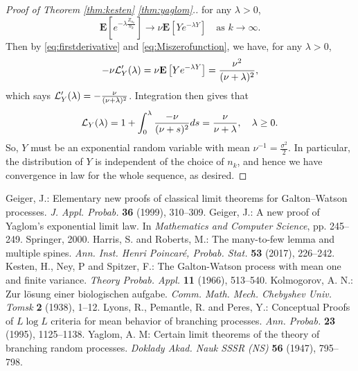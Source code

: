 \documentclass[12pt]{amsart}
\numberwithin{equation}{section}
\newcommand{\brac}[1]{\left[ #1 \right]}
\newcommand{\expct}{\mathbf E}
\begin{document}
\begin{proof}[Proof of Theorem \ref{thm:kesten} \eqref{thm:yaglom}.]
	for any $\lambda >0$,
\begin{equation*}
	    \expct\brac{e^{-\lambda\frac{\dot Z_{n_k}}{n_k}}}
	\to
		\nu\expct\brac{Ye^{-\lambda Y}}%
	\quad
		\text{as } k\to \infty.
\end{equation*}
	Then by \eqref{eq:firstderivative} and \eqref{eq:Miszerofunction}, we have, for any $\lambda >0$,
\begin{equation*}
	    -\nu\cL_Y'(\lambda)
	=
	    \nu\expct\brac{Ye^{-\lambda Y}}
    =	
		\frac{\nu^2}{(\nu+\lambda)^2},
\end{equation*}
	which says $\mathcal L_Y'(\lambda)=-\frac{\nu}{(\nu+\lambda)^2}$.
	Integration then gives that
\begin{equation*}
	    \mathcal L_Y(\lambda)
	=
	    1
	+
	    \int_0^\lambda\frac{-\nu}{(\nu+s)^2}ds
	=
		\frac{\nu}{\nu+\lambda},
	\quad
		\lambda \ge 0.
\end{equation*}
	So, $Y$ must be an 
	exponential random variable
	with mean $\nu^{-1}=\frac{\sigma^2}{2}$. 
	In particular, the distribution of 
	$Y$
	is independent of the choice of $n_k$, and hence we have convergence in law for the whole sequence, as desired.
\end{proof}
\vspace{.1in}
\begin{thebibliography}{99}
	Geiger, J.:
	Elementary new proofs of classical limit theorems for Galton--Watson processes.
	{\it J. Appl. Probab.} \textbf{36} (1999), 310--309.
	Geiger, J.:
	A new proof of Yaglom's exponential limit law.
	In {\it Mathematics and Computer Science}, pp. 245--249.
	Springer, 2000.
	Harris, S. and Roberts, M.:
	The many-to-few lemma and multiple spines.
	{\it Ann.  Inst. Henri Poincar{\'e}, Probab. Stat.}
	\textbf{53} (2017), 226--242.
	Kesten, H.,  Ney, P and Spitzer, F.:
	The Galton-Watson process with mean one and finite variance.
	{\it Theory Probab. Appl.} 
	\textbf{11} (1966), 513--540.
	Kolmogorov, A. N.:
	Zur l{\"o}sung einer biologischen aufgabe.
	{\it Comm. Math. Mech. Chebyshev Univ. Tomsk}
	\textbf{2} (1938), 1--12.
	Lyons, R.,  Pemantle, R. and Peres, Y.:
	Conceptual Proofs of $ L \log L $ criteria for mean behavior of branching processes.
	{\it Ann. Probab.} \textbf{23} (1995), 1125--1138.
	Yaglom, A. M:
	Certain limit theorems of the theory of branching random processes.
	{\it Doklady Akad. Nauk SSSR (NS)} \textbf{56} (1947), 795--798.
\end{thebibliography}
\end{document}
